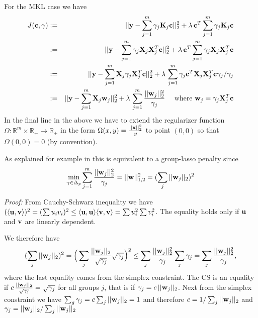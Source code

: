 For the MKL case we have
\begin{eqnarray}\label{eq:MKL=GroupLasso}
J(\mathbf{c},\mathbf{\gamma}) & := & ||\mathbf{y} - \sum_{j=1}^m \gamma_j \mathbf{K}_j \mathbf{c}||_2^2 +
\lambda \, \mathbf{c}^T \sum_{j=1}^m \gamma_j \mathbf{K}_j \mathbf{c} \nonumber \\
& := & ||\mathbf{y} - \sum_{j=1}^m \gamma_j \mathbf{X}_j \mathbf{X}^T_j \mathbf{c}||_2^2 +
\lambda \, \mathbf{c}^T \sum_{j=1}^m \gamma_j \mathbf{X}_j \mathbf{X}^T_j \mathbf{c} \nonumber \\
& := & ||\mathbf{y} - \sum_{j=1}^m \mathbf{X}_j \gamma_j \mathbf{X}^T_j \mathbf{c}||_2^2 +
\lambda \, \sum_{j=1}^m  \gamma_j \mathbf{c}^T \mathbf{X}_j \mathbf{X}^T_j \mathbf{c} \gamma_j / \gamma_j \nonumber \\
& := & ||\mathbf{y} - \sum_{j=1}^m \mathbf{X}_j \mathbf{w}_j ||_2^2 +
\lambda \, \sum_{j=1}^m \frac{|| \mathbf{w}_j||_2^2}{\gamma_j} \quad \text{ where } \mathbf{w}_j =  \gamma_j \mathbf{X}^T_j \mathbf{c}
\end{eqnarray}
In the final line in the above we have to extend the regularizer function $\Omega: \mathbb{R}^m \times \mathbb R_+ \to \mathbb{R}_+ $ in the form $\Omega(x,y) = \frac{||\mathbf{x}||_2^2}{y}$ to point $(0,0)$ so that $\Omega(0,0) = 0$ (by convention). 

As explained for example in \cite{Bach2012} this is equivalent to a group-lasso penalty since 
\begin{equation}
\min_{\gamma \in \Delta_p} \sum_{j=1}^m \frac{|| \mathbf{w}_j||_2^2}{\gamma_j} = ||\mathbf{w}||^2_{1,2} = (\sum_j ||\mathbf{w}_j||_2)^2
\end{equation}

\begin{small}
\emph{Proof:} From Cauchy-Schwarz inequality we have $(\langle \mathbf{u}, \mathbf{v} \rangle)^2 = (\sum u_i v_i)^2 \leq \langle \mathbf{u}, \mathbf{u} \rangle \langle \mathbf{v}, \mathbf{v} \rangle = \sum u_i^2 \sum v_i^2$.
The equality holds only if $\mathbf{u}$ and $\mathbf{v}$ are linearly dependent.

We therefore have
\begin{equation}
(\sum_j ||\mathbf{w}_j||_2)^2 = \Big( \sum_j \frac{||\mathbf{w}_j||_2}{\sqrt{\gamma_j}} \sqrt{\gamma_j} \Big)^2 \leq \sum_j \frac{||\mathbf{w}_j||_2^2}{\gamma_j} \sum_j \gamma_j = \sum_j \frac{||\mathbf{w}_j||_2^2}{\gamma_j},
\end{equation}
where the last equality comes from the simplex constraint.
The CS is an equality if $c \, \frac{||\mathbf{w}_j||_2}{\sqrt{\gamma_j}} = \sqrt{\gamma_j}$ for all groups $j$, that is if $\gamma_j = c \, ||\mathbf{w}_j||_2$.
Next from the simplex constraint we have $\sum_g \gamma_j = c \sum_j ||\mathbf{w}_j||_2 = 1$ and therefore $c = 1/\sum_j ||\mathbf{w}_j||_2$ and $\gamma_j = ||\mathbf{w}_j||_2 / \sum_j ||\mathbf{w}_j||_2$ 
\end{small}


